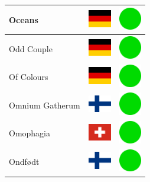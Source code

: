 \documentclass[12pt, a4paper, twoside]{report}
\begin{document}
\begin{center}
\begin{longtable}{|p{5cm}|p{2cm}|p{2cm}|}
 Oceans                                                     & \includegraphics[width=1cm]{../4x3/de} &   \includegraphics[width=1cm]{../likes/y} \\ \hline
 Odd Couple                                                 & \includegraphics[width=1cm]{../4x3/de} &   \includegraphics[width=1cm]{../likes/y} \\ \hline
 Of Colours                                                 & \includegraphics[width=1cm]{../4x3/de} &   \includegraphics[width=1cm]{../likes/y} \\ \hline
 Omnium Gatherum                                            & \includegraphics[width=1cm]{../4x3/fi} &   \includegraphics[width=1cm]{../likes/y} \\ \hline
 Omophagia                                                  & \includegraphics[width=1cm]{../4x3/ch} &   \includegraphics[width=1cm]{../likes/y} \\ \hline
 Ondfødt                                                    & \includegraphics[width=1cm]{../4x3/fi} &   \includegraphics[width=1cm]{../likes/y} \\ \hline

\end{longtable}
\end{center}
\end{document}
